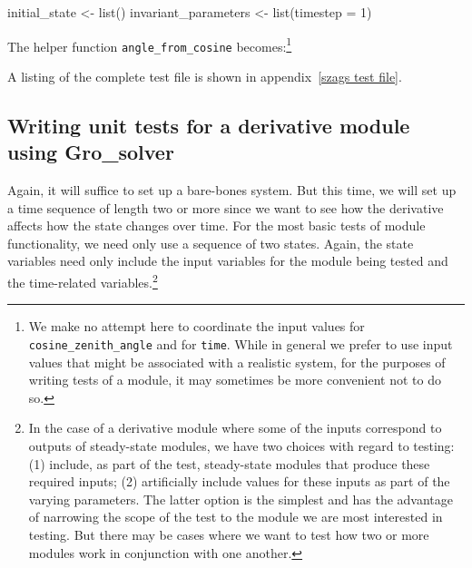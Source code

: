 \documentclass{article}\usepackage[]{graphicx}\usepackage[]{color}
\newcommand{\Rcode}[1]{\lstinline[style=Rstyle]{#1}}
\begin{document}
\begin{appendices}
\begin{enumerate}
\begin{Rexample}[6]
      initial_state <- list()
      invariant_parameters <- list(timestep = 1)
    \end{Rexample}

The helper function \Rcode{angle_from_cosine} becomes:\footnote{
      We make no attempt here to coordinate the input
      values for \Rcode{cosine_zenith_angle} and for
      \Rcode{time}. While in general we prefer to use input
      values that might be associated with a realistic system, for
      the purposes of writing tests of a module, it may sometimes be
      more convenient not to do so.}


  A listing of the complete test file is shown in appendix~\ref{szags
    test file}.

\end{enumerate}


\subsection{Writing unit tests for a derivative module using Gro\_solver}

Again, it will suffice to set up a bare-bones system.  But this time,
we will set up a time sequence of length two or more since we want to
see how the derivative affects how the state changes over time.  For
the most basic tests of module functionality, we need only use a
sequence of two states.  Again, the state variables need only include
the input variables for the module being tested and the time-related
variables.\footnote{
  In the case of a derivative module where some of the inputs
  correspond to outputs of steady-state modules, we have two choices
  with regard to testing: (1) include, as part of the test,
  steady-state modules that produce these required inputs; (2)
  artificially include values for these inputs as part of the varying
  parameters.  The latter option is the simplest and has the advantage
  of narrowing the scope of the test to the module we are most
  interested in testing.  But there may be cases where we want to test
  how two or more modules work in conjunction with one another.}


\end{appendices}
\end{document}
